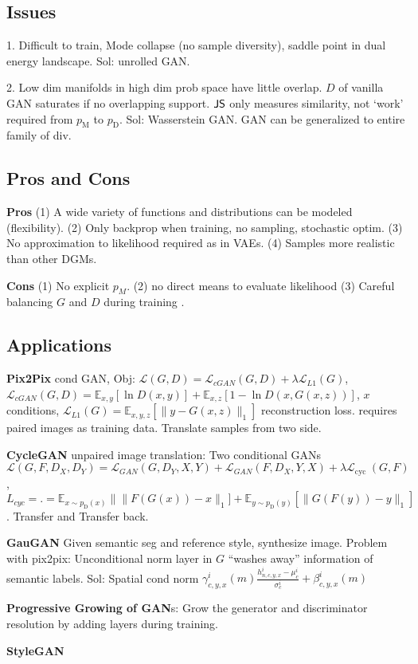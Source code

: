 \subsection*{Issues}

1. Difficult to train, Mode collapse (no sample diversity), saddle point in dual energy landscape. Sol: unrolled GAN.

2. Low dim manifolds in high dim prob space have little overlap. \(D\) of vanilla GAN saturates if no overlapping support. \(\operatorname{\mathsf{JS}}\) only measures similarity, not `work' required from \(p_{\text {M}}\) to  \(p_{\text {D}}\). Sol: Wasserstein GAN. GAN can be generalized to entire family of div.

\subsection*{Pros and Cons}
\textbf{Pros} (1) A wide variety of functions and distributions can be modeled (flexibility). (2) Only backprop when training, no sampling, stochastic optim. (3)  No approximation to likelihood required as in VAEs. (4) Samples more realistic than other DGMs.

\textbf{Cons} (1) No explicit \(p_{M}\). (2) no direct means to evaluate likelihood (3) Careful balancing \(G\) and \(D\) during training .

\subsection*{Applications}

\textbf{Pix2Pix} cond GAN, Obj: \(\mathcal{L}(G, D)=\mathcal{L}_{c G A N}(G, D)+\lambda \mathcal{L}_{L 1}(G)\), \(\mathcal{L}_{{cGAN}}(G, D)=\mathbb{E}_{x, y}[\ln D(x, y)]+\mathbb{E}_{x, z}[1-\ln D(x, G(x, z))]\), \(x\) conditions, \(\mathcal{L}_{L 1}(G)=\mathbb{E}_{x, y, z}[\|y-G(x, z)\|_{1}]\) reconstruction loss. requires paired images as training data. Translate samples from two side.

\textbf{CycleGAN} unpaired image translation: Two conditional GANs \(\mathcal{L}(G, F, D_{X}, D_{Y})=\mathcal{L}_{G A N}(G, D_{Y}, X, Y)+\mathcal{L}_{G A N}(F, D_{X}, Y, X)+\lambda \mathcal{L}_{\text {cyc }}(G, F)\), \(L_{cyc} = .=\mathbb{E}_{x \sim p_{\text {D}}(x)}\|\| F(G(x))-x \|_{1}]+\mathbb{E}_{y \sim p_{\text {D}}(y)}[\|G(F(y))-y\|_{1}]\). Transfer and Transfer back.

\textbf{GauGAN} Given semantic seg and reference style, synthesize image. Problem with pix2pix: Unconditional norm layer in \(G\) “washes away” information of semantic labels. Sol: Spatial cond norm \(\gamma_{c, y, x}^{i}({m}) \frac{h_{n, c, y, x}^{i}-\mu_{c}^{i}}{\sigma_{c}^{i}}+\beta_{c, y, x}^{i}({m})\)

\textbf{Progressive Growing of GAN}s:  Grow the generator and discriminator resolution by adding layers during training.

\textbf{StyleGAN}
